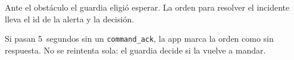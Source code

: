 Ante el obstáculo el guardia eligió esperar. La orden para resolver el incidente lleva el id de la alerta y la decisión.

\noindent
\begin{minipage}[t]{0.49\textwidth}


\end{minipage}\hfill
\begin{minipage}[t]{0.49\textwidth}

\end{minipage}

Si pasan 5~segundos sin un \texttt{command\_ack}, la app marca la orden como sin respuesta. No se reintenta sola: el guardia decide si la vuelve a mandar.
